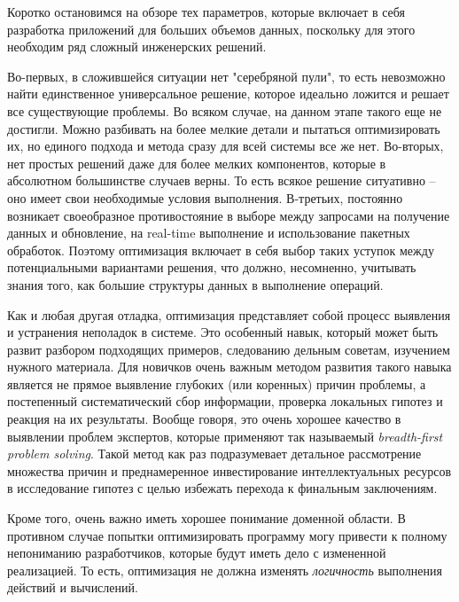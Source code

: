 \label{sec:optimization}

Коротко остановимся на обзоре тех параметров, которые включает в себя разработка приложений для больших объемов данных, поскольку для этого необходим ряд сложный инженерских решений.

Во-первых, в сложившейся ситуации нет "серебряной пули", то есть невозможно найти единственное универсальное решение, которое идеально ложится и решает все существующие проблемы. Во всяком случае, на данном этапе такого еще не достигли. Можно разбивать на более мелкие детали и пытаться оптимизировать их, но единого подхода и метода сразу для всей системы все же нет. Во-вторых, нет простых решений даже для более мелких компонентов, которые в абсолютном большинстве случаев верны. То есть всякое решение ситуативно – оно имеет свои необходимые условия выполнения. В-третьих, постоянно возникает своеобразное противостояние в выборе между запросами на получение данных и обновление, на real-time выполнение и использование пакетных обработок. Поэтому оптимизация включает в себя выбор таких уступок между потенциальными вариантами решения, что должно, несомненно, учитывать знания того, как \logiql большие структуры данных в выполнение операций.

Как и любая другая отладка, оптимизация представляет собой процесс выявления и устранения неполадок в системе. Это особенный навык, который может быть развит разбором подходящих примеров, следованию дельным советам, изучением нужного материала. Для новичков очень важным методом развития такого навыка является не прямое выявление глубоких (или коренных) причин проблемы, а постепенный систематический сбор информации, проверка локальных гипотез и реакция на их результаты. Вообще говоря, это очень хорошее качество в выявлении проблем экспертов, которые применяют так называемый \emph{breadth-first problem solving}. Такой метод как раз подразумевает детальное рассмотрение множества причин и преднамеренное инвестирование интеллектуальных ресурсов в исследование гипотез с целью избежать перехода к финальным заключениям.

Кроме того, очень важно иметь хорошее понимание доменной области. В противном случае попытки оптимизировать программу могу привести к полному непониманию разработчиков, которые будут иметь дело с измененной реализацией. То есть, оптимизация не должна изменять \emph{логичность} выполнения действий и вычислений.










